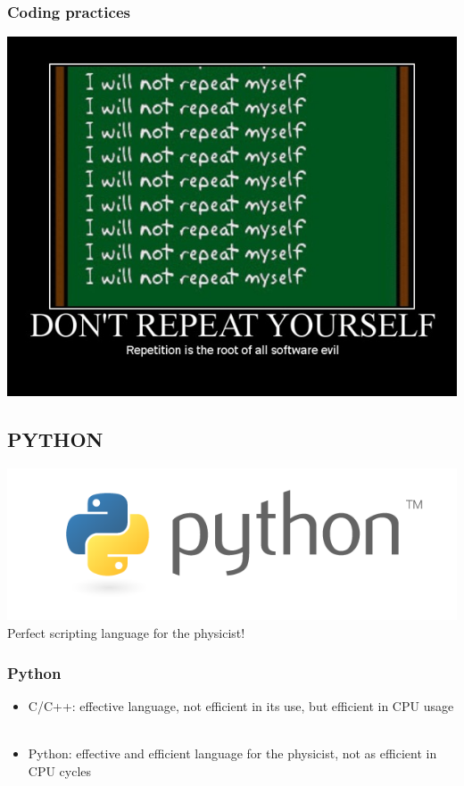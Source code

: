 \documentclass[14pt]{beamer}
\begin{document}
\begin{frame}
\frametitle{Coding practices}
\centering
\includegraphics[width=\textwidth]{dontrepeatyourself_motivator_2}

\end{frame}

\subsection{PYTHON}
\begin{frame}
\includegraphics[width=\textwidth]{python-logo-master-v3-TM}\\
Perfect scripting language for the physicist!
\end{frame}

\begin{frame}
\frametitle{Python}
\begin{itemize}
\item C/C++: effective language, not efficient in its use, but efficient in CPU usage\\~
\item Python: effective and efficient language for the physicist, not as efficient in CPU cycles
\end{itemize}
\end{frame}
\end{document}
